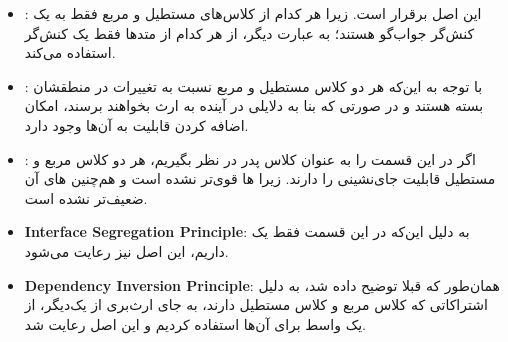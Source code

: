 \begin{itemize}
	\item \textbf{}: این اصل برقرار است. زیرا هر کدام از کلاس‌های مستطیل و مربع فقط به یک کنش‌گر جواب‌گو هستند؛ به عبارت دیگر، از هر کدام از متدها فقط یک کنش‌گر استفاده می‌کند. 
	\item \textbf{}: با توجه به این‌که هر دو کلاس مستطیل و مربع نسبت به تغییرات در منطقشان بسته هستند و در صورتی که بنا به دلایلی در آینده به ارث بخواهند برسند، امکان اضافه کردن قابلیت به آن‌ها وجود دارد.
	\item \textbf{}: اگر در این قسمت  را به عنوان کلاس پدر در نظر بگیریم، هر دو کلاس مربع و مستطیل قابلیت جای‌نشینی را دارند. زیرا ها قوی‌تر نشده است و هم‌چنین های آن ضعیف‌تر نشده است.
	\item \textbf{Interface Segregation Principle}: به دلیل این‌که در این قسمت فقط یک  داریم، این اصل نیز رعایت می‌شود.
	\item \textbf{Dependency Inversion Principle}: همان‌طور که قبلا توضیح داده شد، به دلیل اشتراکاتی که کلاس مربع و کلاس مستطیل دارند، به جای ارث‌بری از یک‌دیگر، از یک واسط برای آن‌ها استفاده کردیم و این اصل رعایت شد.
\end{itemize}